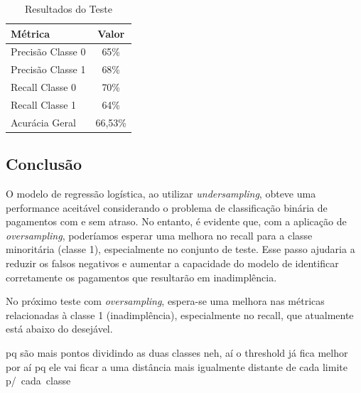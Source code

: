 \documentclass{abntpuc}
\begin{document}
\begin{table}[H]
\centering
\begin{tabular}{|l|c|}
\hline
Métrica & Valor \\
\hline
Precisão Classe 0 & 65\% \\
Precisão Classe 1 & 68\% \\
Recall Classe 0 & 70\% \\
Recall Classe 1 & 64\% \\
Acurácia Geral & 66,53\% \\
\hline
\end{tabular}
\caption{Resultados do Teste}
\label{tab:resultados}
\end{table}

\subsection*{\centering\large\textbf{Conclusão}}

O modelo de regressão logística, ao utilizar \textit{undersampling}, obteve uma performance aceitável considerando o problema de classificação binária de pagamentos com e sem atraso. No entanto, é evidente que, com a aplicação de \textit{oversampling}, poderíamos esperar uma melhora no recall para a classe minoritária (classe 1), especialmente no conjunto de teste. Esse passo ajudaria a reduzir os falsos negativos e aumentar a capacidade do modelo de identificar corretamente os pagamentos que resultarão em inadimplência.

No próximo teste com \textit{oversampling}, espera-se uma melhora nas métricas relacionadas à classe 1 (inadimplência), especialmente no recall, que atualmente está abaixo do desejável.



pq são mais pontos dividindo as duas classes neh, aí o threshold já fica melhor por aí pq ele vai ficar a uma distância mais igualmente distante de cada limite p/ cada classe

\renewcommand\bibname{REFERÊNCIAS}
\addcontentsline{toc}{chapter}{\bibname}

\end{document}
